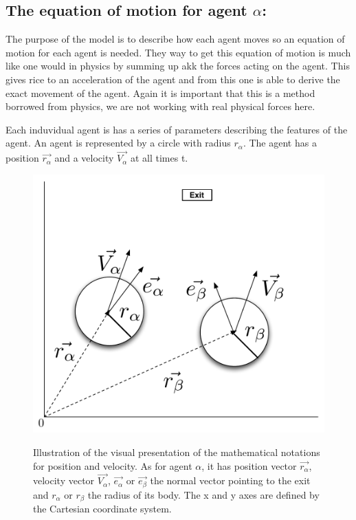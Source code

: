 \subsection{The equation of motion for agent $ \alpha $:}
The purpose of the model is to describe how each agent moves so an equation of motion for each agent 
is needed. They way to get this equation of motion is much like one would in physics by summing 
up akk the forces acting on the agent. This gives rice to an acceleration of the agent and from this 
one is able to derive the exact movement of the agent. Again it is important that this is a method 
borrowed from physics, we are not working with real physical forces here.

Each induvidual agent is has a series of parameters describing the features of the agent. An agent is 
represented by a circle with radius $r_{\alpha}$. The agent has a position $\vec{r_{\alpha}}$ and a 
velocity $\vec{V_{\alpha}}$ at all times t.

\begin{figure}[hb]
    \centering
    {\includegraphics[scale=0.35]{Figures/NotationOfAgent.pdf}} 
    \caption[Notation of an agent]{Illustration of the visual presentation of the mathematical notations for position and velocity. As for agent $ \alpha $,
	    it has position vector $ \vec{r_{\alpha}} $, velocity vector $ \vec{V_{\alpha}} $, $\vec{e_{\alpha}}$ or $\vec{e_{\beta}}$ the normal vector pointing
	    to the exit and  $ r_{\alpha} $ or  $ r_{\beta} $ the radius of its body.
	    The x and y axes are defined by the Cartesian coordinate system.}
    \label{NotationOfAgent}
\end{figure}

